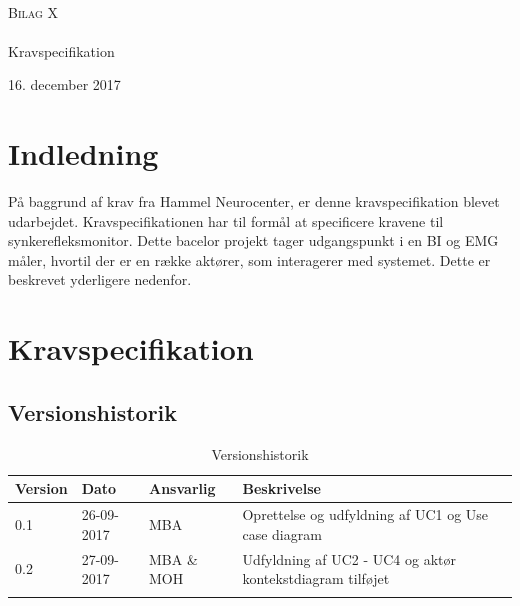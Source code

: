 \documentclass[main.tex]{subfiles}
\begin{document}
\begin{titlingpage}
\begin{center}

~ \\[3cm]


\textsc{\LARGE Bilag X}\\[1.5cm]


\noindent\makebox[\linewidth]{\rule{\textwidth}{0.4pt}}\\
[0.5cm]{\Huge Kravspecifikation}
\noindent\makebox[\linewidth]{\rule{\textwidth}{0.4pt}}
\end{center}
\vfill
\begin{center}
{\large 16. december 2017}
\end{center}
\end{titlingpage}

\newpage
\tableofcontents*


\chapter{Indledning}
På baggrund af krav fra Hammel Neurocenter, er denne
kravspecifikation blevet udarbejdet. Kravspecifikationen har til formål at specificere
kravene til synkerefleksmonitor. Dette bacelor projekt tager udgangspunkt i en BI og EMG måler, hvortil der
er en række aktører, som interagerer med systemet. Dette er beskrevet yderligere nedenfor.

\chapter{Kravspecifikation}
\section{Versionshistorik}
\begin{table}[H]

\begin{longtabu} to 
    Version 	&    Dato 		&    Ansvarlig 	&    Beskrivelse\\[-1ex]
     		&  	26-09-2017 	&   MBA 	&   Oprettelse og udfyldning af UC1 og Use case diagram \\
	0.2			&	27-09-2017	&	MBA \& MOH	&	Udfyldning af UC2 - UC4 og aktør kontekstdiagram tilføjet\\
    
\label{version_Systemark}
\end{longtabu}
 \caption {Versionshistorik}
    \label{tab:Versionshistorik}
\end{table}
\end{document}
